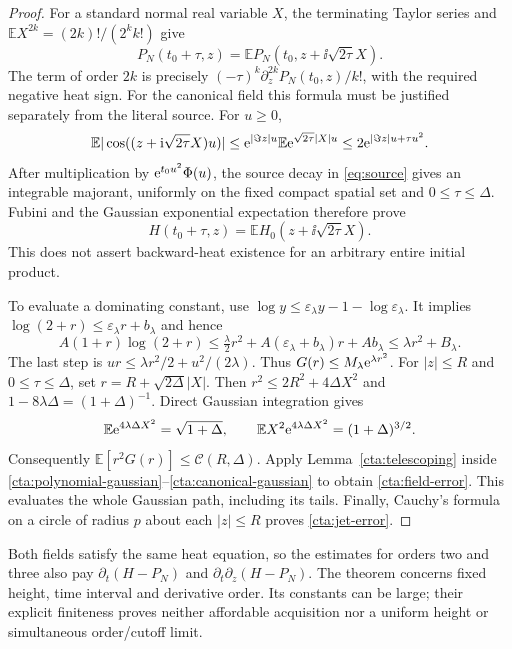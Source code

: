 \begin{proof}
For a standard normal real variable $X$, the terminating Taylor series
and $\mathbb E X^{2k}=(2k)!/(2^kk!)$ give
\begin{equation}
 P_N(t_0+\tau,z)
   =\mathbb E P_N(t_0,z+\ii\sqrt{2\tau}X).
 \label{cta:polynomial-gaussian}
\end{equation}
The term of order $2k$ is precisely
$(-\tau)^k\partial_z^{2k}P_N(t_0,z)/k!$, with the required negative
heat sign. For the canonical field this formula must be justified
separately from the literal source. For $u\ge0$,
\[
 \mathbb E|\cos((z+\mathrm i\sqrt{2\tau}X)u)|
 \le \mathrm e^{|\Im z|u}\mathbb E\mathrm e^{\sqrt{2\tau}|X|u}
 \le2\mathrm e^{|\Im z|u+\tau u^2}.
\]
After multiplication by $\mathrm e^{t_0u^2}\Phi(u)$, the source decay in
\eqref{eq:source} gives an integrable majorant, uniformly on the fixed
compact spatial set and $0\le\tau\le\Delta$. Fubini and the Gaussian
exponential expectation therefore prove
\begin{equation}
 H(t_0+\tau,z)=\mathbb E H_0(z+\ii\sqrt{2\tau}X).
 \label{cta:canonical-gaussian}
\end{equation}
This does not assert backward-heat existence for an arbitrary entire
initial product.

To evaluate a dominating constant, use
$\log y\le\varepsilon_\lambda y-1-\log\varepsilon_\lambda$.
It implies $\log(2+r)\le\varepsilon_\lambda r+b_\lambda$ and hence
\[
 A(1+r)\log(2+r)
 \le\tfrac\lambda2r^2+A(\varepsilon_\lambda+b_\lambda)r+A b_\lambda
 \le\lambda r^2+B_\lambda.
\]
The last step is $ur\le\lambda r^2/2+u^2/(2\lambda)$.
Thus $G(r)\le M_\lambda\mathrm e^{\lambda r^2}$.
For $|z|\le R$ and $0\le\tau\le\Delta$, set
$r=R+\sqrt{2\Delta}|X|$. Then
$r^2\le2R^2+4\Delta X^2$ and
$1-8\lambda\Delta=(1+\Delta)^{-1}$. Direct Gaussian integration gives
\[
 \mathbb E\mathrm e^{4\lambda\Delta X^2}=\sqrt{1+\Delta},\qquad
 \mathbb E X^2\mathrm e^{4\lambda\Delta X^2}=(1+\Delta)^{3/2}.
\]
Consequently $\mathbb E[r^2G(r)]\le\mathcal C(R,\Delta)$.
Apply Lemma~\ref{cta:telescoping} inside
\eqref{cta:polynomial-gaussian}--\eqref{cta:canonical-gaussian} to obtain
\eqref{cta:field-error}. This evaluates the whole Gaussian path,
including its tails. Finally, Cauchy's formula on a circle of radius
$p$ about each $|z|\le R$ proves \eqref{cta:jet-error}.
\end{proof}

Both fields satisfy the same heat equation, so the estimates for orders
two and three also pay $\partial_t(H-P_N)$ and
$\partial_t\partial_z(H-P_N)$. The theorem concerns fixed height,
time interval and derivative order. Its constants can be large; their
explicit finiteness proves neither affordable acquisition nor a uniform
height or simultaneous order/cutoff limit.

